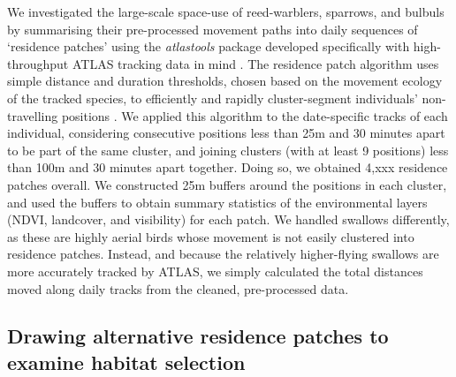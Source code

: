 \begin{refsection}
We investigated the large-scale space-use of reed-warblers, sparrows, and bulbuls by summarising their pre-processed movement paths into daily sequences of `residence patches' using the \textit{atlastools} package developed specifically with high-throughput ATLAS tracking data in mind \citep{gupte2021b}.
The residence patch algorithm uses simple distance and duration thresholds, chosen based on the movement ecology of the tracked species, to efficiently and rapidly cluster-segment individuals' non-travelling positions \citep{gupte2021b}.
We applied this algorithm to the date-specific tracks of each individual, considering consecutive positions less than 25m and 30 minutes apart to be part of the same cluster, and joining clusters (with at least 9 positions) less than 100m and 30 minutes apart together.
Doing so, we obtained 4,xxx residence patches overall.
We constructed 25m buffers around the positions in each cluster, and used the buffers to obtain summary statistics of the environmental layers (NDVI, landcover, and visibility) for each patch.
We handled swallows differently, as these are highly aerial birds whose movement is not easily clustered into residence patches.
Instead, and because the relatively higher-flying swallows are more accurately tracked by ATLAS, we simply calculated the total distances moved along daily tracks from the cleaned, pre-processed data.

\subsection*{Drawing alternative residence patches to examine habitat selection}


\end{refsection}

